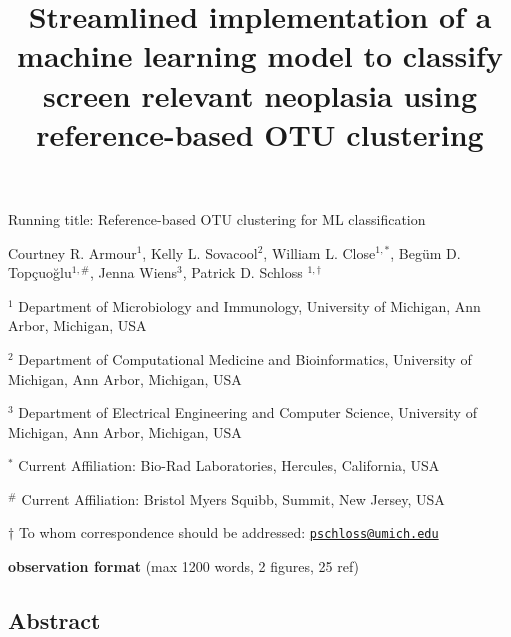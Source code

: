 \documentclass[
]{article}
\title{\textbf{Streamlined implementation of a machine learning model to
classify screen relevant neoplasia using reference-based OTU
clustering}}
\author{}
\date{\vspace{-2.5em}}
\begin{document}
\maketitle

\vspace{5mm}

Running title: Reference-based OTU clustering for ML classification

\vspace{10mm}

Courtney R. Armour\({^1}\), Kelly L. Sovacool\({^2}\), William L.
Close\(^{1,*}\), Begüm D. Topçuoğlu\(^{1,\#}\), Jenna Wiens\({^3}\),
Patrick D. Schloss \(^{1,\dagger}\)

\vspace{10mm}

\({^1}\) Department of Microbiology and Immunology, University of
Michigan, Ann Arbor, Michigan, USA

\({^2}\) Department of Computational Medicine and Bioinformatics,
University of Michigan, Ann Arbor, Michigan, USA

\({^3}\) Department of Electrical Engineering and Computer Science,
University of Michigan, Ann Arbor, Michigan, USA

\({^*}\) Current Affiliation: Bio-Rad Laboratories, Hercules,
California, USA

\({^\#}\) Current Affiliation: Bristol Myers Squibb, Summit, New Jersey,
USA

\(\dagger\) To whom correspondence should be addressed:
\href{mailto:pschloss@umich.edu}{\nolinkurl{pschloss@umich.edu}}

\vspace{10mm}

\textbf{observation format} (max 1200 words, 2 figures, 25 ref)

\newpage

\linenumbers

\hypertarget{abstract}{%
\subsection{Abstract}\label{abstract}}
\end{document}
